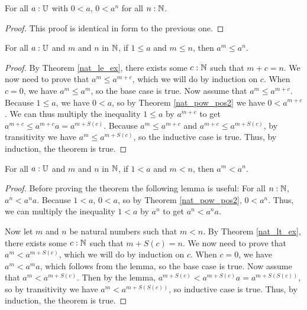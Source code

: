 \documentclass[../../math.tex]{subfiles}
\begin{document}
\begin{theorem} \label{nat_pow_pos2}
    For all $a : \mathbb{U}$ with $0 < a$, $0 < a^n$ for all $n : \mathbb{N}$.
\end{theorem}
\begin{proof}
    This proof is identical in form to the previous one.
\end{proof}

\begin{theorem}
    For all $a : \mathbb{U}$ and $m$ and $n$ in $\mathbb{N}$, if $1 \leq a$ and $m \leq n$, then
    $a^m \leq a^n$.
\end{theorem}
\begin{proof}
    By Theorem \ref{nat_le_ex}, there exists some $c : \mathbb{N}$ such that $m + c =
    n$.  We now need to prove that $a^m \leq a^{m + c}$, which we will do by
    induction on $c$.  When $c = 0$, we have $a^m \leq a^m$, so the base case is
    true.  Now assume that $a^m \leq a^{m + c}$.  Because $1 \leq a$, we have $0
    < a$, so by Theorem \ref{nat_pow_pos2} we have $0 < a^{m + c}$.  We can thus
    multiply the inequality $1 \leq a$ by $a^{m + c}$ to get $a^{m + c} \leq
    a^{m + c}a = a^{m + S(c)}$.  Because $a^m \leq a^{m + c}$ and $a^{m + c}
    \leq a^{m + S(c)}$, by transitivity we have $a^m \leq a^{m + S(c)}$, so the
    inductive case is true.  Thus, by induction, the theorem is true.
\end{proof}

\begin{theorem}
    For all $a : \mathbb{U}$ and $m$ and $n$ in $\mathbb{N}$, if $1 < a$ and $m < n$, then $a^m
    < a^n$.
\end{theorem}
\begin{proof}
    Before proving the theorem the following lemma is useful: For all $n : \mathbb{N}$,
    $a^n < a^na$.  Because $1 < a$, $0 < a$, so by Theorem \ref{nat_pow_pos2},
    $0 < a^n$.  Thus, we can multiply the inequality $1 < a$ by $a^n$ to get
    $a^n < a^na$.

    Now let $m$ and $n$ be natural numbers such that $m < n$.  By Theorem
    \ref{nat_lt_ex}, there exists some $c : \mathbb{N}$ such that $m + S(c) = n$.  We
    now need to prove that $a^m < a^{m + S(c)}$, which we will do by induction
    on $c$.  When $c = 0$, we have $a^m < a^ma$, which follows from the lemma,
    so the base case is true.  Now assume that $a^m < a^{m + S(c)}$.  Then by
    the lemma, $a^{m + S(c)} < a^{m + S(c)}a = a^{m + S(S(c))}$, so by
    transitivity we have $a^m < a^{m + S(S(c))}$, so inductive case is true.
    Thus, by induction, the theorem is true.
\end{proof}
\end{document}

